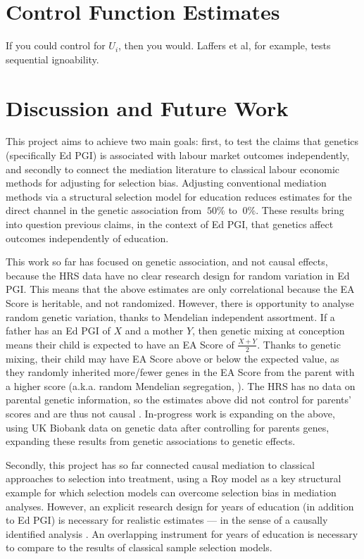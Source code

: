 \section{Control Function Estimates}
\label{sec:controlfun}

If you could control for $U_i$, then you would.
Laffers et al, for example, tests sequential ignoability.



\section{Discussion and Future Work}
\label{sec:discussion}

This project aims to achieve two main goals:
first, to test the claims that genetics (specifically Ed PGI) is associated with labour market outcomes independently, and secondly to connect the mediation literature to classical labour economic methods for adjusting for selection bias.
Adjusting conventional mediation methods via a structural selection model for education reduces estimates for the direct channel in the genetic association from $~50\%$ to $~0\%$.
These results bring into question previous claims, in the context of Ed PGI, that genetics affect outcomes independently of education.

This work so far has focused on genetic association, and not causal effects, because the HRS data have no clear research design for random variation in Ed PGI.
This means that the above estimates are only correlational because the EA Score is heritable, and not randomized.
However, there is opportunity to analyse random genetic variation, thanks to Mendelian independent assortment.
If a father has an Ed PGI of $X$ and a mother $Y$, then genetic mixing at conception means their child is expected to have an EA Score of $\frac{X+Y}{2}$.
Thanks to genetic mixing, their child may have EA Score above or below the expected value, as they randomly inherited more/fewer genes in the EA Score from the parent with a higher score (a.k.a. random Mendelian segregation, \citealt{young2018relatedness}).
The HRS has no data on parental genetic information, so the estimates above did not control for parents' scores and are thus not causal \citep{young2022mendelian}.
In-progress work is expanding on the above, using UK Biobank data on genetic data after controlling for parents genes, expanding these results from genetic associations to genetic effects.

Secondly, this project has so far connected causal mediation to classical approaches to selection into treatment, using a Roy model as a key structural example for which selection models can overcome selection bias in mediation analyses.
However, an explicit research design for years of education (in addition to Ed PGI) is necessary for realistic estimates --- in the sense of a causally identified analysis \citep{angrist2009mostly}.
An overlapping instrument for years of education is necessary to compare to the results of classical sample selection models.
